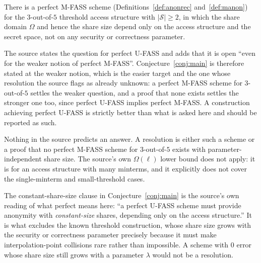 \documentclass{conjura-conjecture}
\newcommand{\Sh}{\mathcal{S}}
\newcommand{\Om}{\Omega}
\begin{document}
\begin{conjecture}\label{conj:main}
There is a perfect M-FASS scheme (Definitions~\ref{def:anonrec}
and~\ref{def:manon}) for the $3$-out-of-$5$ threshold access structure
with $|\Sh| \ge 2$, in which the share domain $\Omega$ and hence the
share size depend only on the access structure and the secret space, not
on any security or correctness parameter.
\end{conjecture}

\begin{remark}
The source states the question for perfect U-FASS and adds that it is
open ``even for the weaker notion of perfect M-FASS''.
Conjecture~\ref{conj:main} is therefore stated at the weaker notion,
which is the easier target and the one whose resolution the source flags
as already unknown: a perfect M-FASS scheme for $3$-out-of-$5$ settles
the weaker question, and a proof that none exists settles the stronger
one too, since perfect U-FASS implies perfect M-FASS\@. A construction
achieving perfect U-FASS is strictly better than what is asked here and
should be reported as such.
\end{remark}

\begin{remark}
Nothing in the source predicts an answer. A resolution is either such a
scheme or a proof that no perfect M-FASS scheme for $3$-out-of-$5$ exists
with parameter-independent share size. The source's own $\Om(\ell)$ lower
bound does not apply: it is for an access structure with many minterms,
and it explicitly does not cover the single-minterm and small-threshold
cases.
\end{remark}

\begin{remark}
The constant-share-size clause in Conjecture~\ref{conj:main} is the
source's own reading of what perfect means here: ``a perfect U-FASS
scheme must provide anonymity with \emph{constant-size} shares, depending
only on the access structure.'' It is what excludes the known
threshold construction, whose share size grows with the security or
correctness parameter precisely because it must make interpolation-point
collisions rare rather than impossible. A scheme with $0$ error whose
share size still grows with a parameter $\lambda$ would not be a
resolution.
\end{remark}
\end{document}

